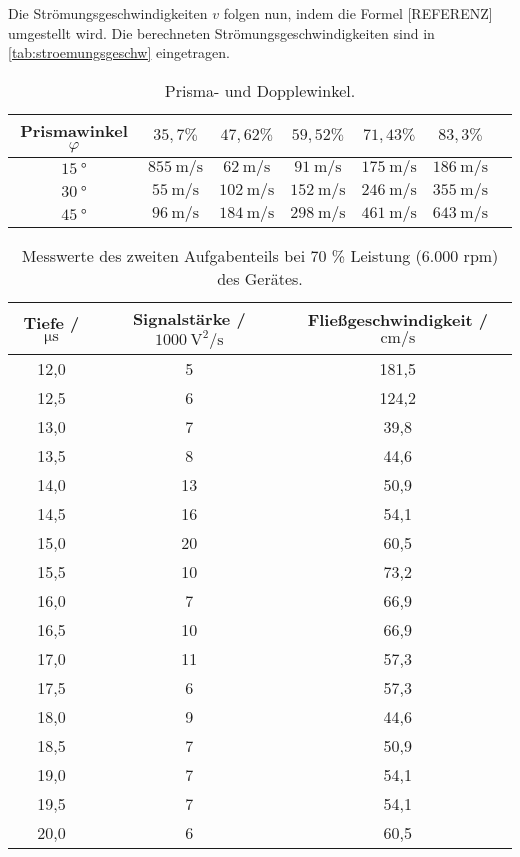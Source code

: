 \noindent
Die Strömungsgeschwindigkeiten $v$ folgen nun, indem die Formel [REFERENZ] umgestellt wird. Die berechneten Strömungsgeschwindigkeiten sind in \autoref{tab:stroemungsgeschw} eingetragen.
\begin{table}[H]
  \centering
  \caption{Prisma- und Dopplewinkel.}
  \label{tab:stroemungsgeschw}
  \begin{tabular}{c c c c c c c}
    \toprule
    Prismawinkel $\varphi$ & $35,7 \%$ & $47,62 \%$ & $59,52 \%$ & $71,43 \%$ & $83,3 \%$\\
    \midrule
    $\SI{15}{\degree}$ & $\SI{855}{\meter\per\second}$ & $\SI{62}{\meter\per\second}$ & $\SI{91}{\meter\per\second}$ & $\SI{175}{\meter\per\second}$ & $\SI{186}{\meter\per\second}$ \\
    $\SI{30}{\degree}$ & $\SI{55}{\meter\per\second}$ & $\SI{102}{\meter\per\second}$ & $\SI{152}{\meter\per\second}$ & $\SI{246}{\meter\per\second}$ & $\SI{355}{\meter\per\second}$ \\
    $\SI{45}{\degree}$ & $\SI{96}{\meter\per\second}$ & $\SI{184}{\meter\per\second}$ & $\SI{298}{\meter\per\second}$ & $\SI{461}{\meter\per\second}$ & $\SI{643}{\meter\per\second}$ \\
    \bottomrule
  \end{tabular}
\end{table}


\begin{table}[H]
  \centering
  \caption{Messwerte des zweiten Aufgabenteils bei 70 \% Leistung (6.000 rpm) des Gerätes.}
  \label{tab:Werte1}
  \begin{tabular}{c c c}
    \toprule
    Tiefe / $\si{\micro\second}$ & Signalstärke / $\SI{1000}{\square\volt\per\second}$ & Fließgeschwindigkeit / $\si{\centi\meter\per\second}$ \\
    \midrule
    12,0 & 5 & 181,5 \\
    12,5 & 6 & 124,2 \\
    13,0 & 7 & 39,8 \\
    13,5 & 8 & 44,6 \\
    14,0 & 13 & 50,9 \\
    14,5 & 16 & 54,1 \\
    15,0 & 20  & 60,5 \\
    15,5 & 10 & 73,2 \\
    16,0 & 7 & 66,9 \\
    16,5 & 10 & 66,9 \\
    17,0 & 11 & 57,3 \\
    17,5 & 6 & 57,3 \\
    18,0 & 9 & 44,6 \\
    18,5 & 7 & 50,9 \\
    19,0 & 7 & 54,1 \\
    19,5 & 7 & 54,1 \\
    20,0 & 6 & 60,5 \\
    \bottomrule
  \end{tabular}
\end{table}

